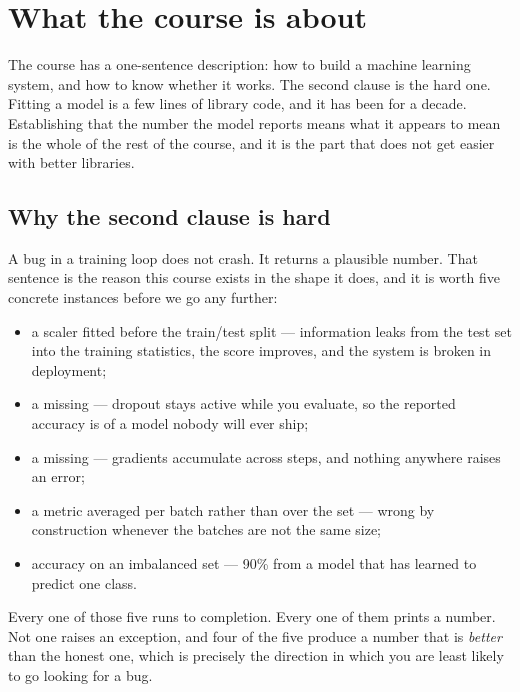 \documentclass[11pt,a4paper]{article}
\begin{document}

\section{What the course is about}

The course has a one-sentence description: how to build a machine learning
system, and how to know whether it works. The second clause is the hard one.
Fitting a model is a few lines of library code, and it has been for a decade.
Establishing that the number the model reports means what it appears to mean is
the whole of the rest of the course, and it is the part that does not get
easier with better libraries.

\subsection{Why the second clause is hard}

A bug in a training loop does not crash. It returns a plausible number. That
sentence is the reason this course exists in the shape it does, and it is worth
five concrete instances before we go any further:

\begin{itemize}[leftmargin=1.4em,itemsep=2pt]
  \item a scaler fitted before the train/test split --- information leaks from
        the test set into the training statistics, the score improves, and the
        system is broken in deployment;
  \item a missing  --- dropout stays active while you
        evaluate, so the reported accuracy is of a model nobody will ever ship;
  \item a missing  --- gradients accumulate across
        steps, and nothing anywhere raises an error;
  \item a metric averaged per batch rather than over the set --- wrong by
        construction whenever the batches are not the same size;
  \item accuracy on an imbalanced set --- 90\% from a model that has learned to
        predict one class.
\end{itemize}

\begin{failbox}[title={The property that organises this course}]
Every one of those five runs to completion. Every one of them prints a number.
Not one raises an exception, and four of the five produce a number that is
\emph{better} than the honest one, which is precisely the direction in which
you are least likely to go looking for a bug.
\end{failbox}
\end{document}
